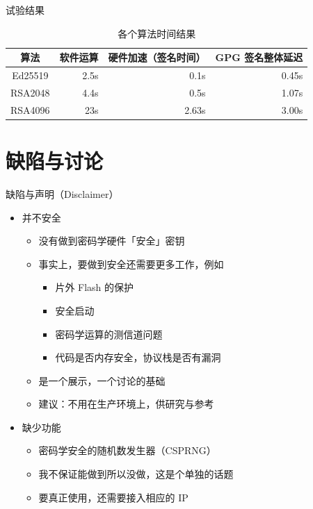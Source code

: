 \documentclass[aspectratio=169]{ctexbeamer}
\begin{document}
\begin{frame}{试验结果}
  \begin{table}
    \centering
    \caption{各个算法时间结果}
    \begin{threeparttable}
    \begin{tabular}{crrr}
      \toprule
      算法 & 软件运算 & 硬件加速（签名时间） & GPG 签名整体延迟\\
      \midrule
      Ed25519 & 2.5s & 0.1s & 0.45s\\
      RSA2048 & 4.4s & 0.5s & 1.07s\\
      RSA4096 & 23s & 2.63s & 3.00s\\
      \bottomrule
    \end{tabular}
    \end{threeparttable}
    \label{tab:sbox-area}
  \end{table}
\end{frame}

\section{缺陷与讨论}
\begin{frame}{缺陷与声明（Disclaimer）}
  \begin{itemize}
    \item 并不安全\begin{itemize}
      \item 没有做到密码学硬件「安全」密钥
      \item 事实上，要做到安全还需要更多工作，例如\begin{itemize}
        \item 片外 Flash 的保护
        \item 安全启动
        \item 密码学运算的测信道问题
        \item 代码是否内存安全，协议栈是否有漏洞
      \end{itemize}
      \item 是一个展示，一个讨论的基础
      \item 建议：不用在生产环境上，供研究与参考
    \end{itemize}
    \item 缺少功能\begin{itemize}
      \item 密码学安全的随机数发生器（CSPRNG） %
      \item 我不保证能做到所以没做，这是个单独的话题
      \item 要真正使用，还需要接入相应的 IP
    \end{itemize}
  \end{itemize}
\end{frame}
\end{document}
